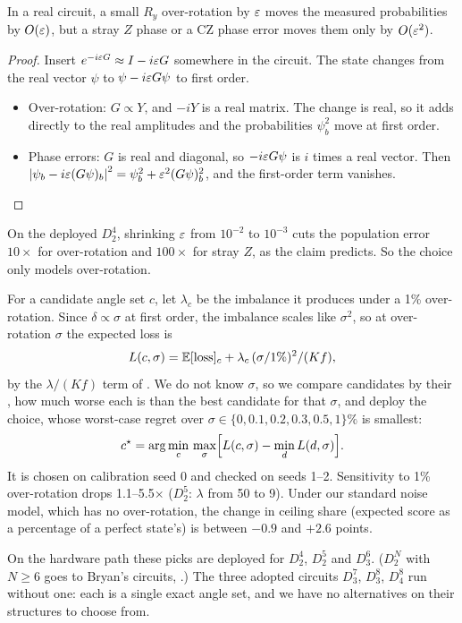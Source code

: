 \documentclass[11pt]{scrartcl}
\newcommand{\D}[2]{D^{#1}_{#2}}
\newcommand{\CZ}{\ensuremath{\mathrm{CZ}}}
\begin{document}
\begin{claim}
  In a real circuit, a small $R_y$ over-rotation by $\varepsilon$ moves the measured probabilities by
  $O(\varepsilon)$, but a stray $Z$ phase or a \CZ{} phase error moves them only by $O(\varepsilon^2)$.
\end{claim}
\begin{proof}
  Insert $e^{-i\varepsilon G}\approx I-i\varepsilon G$ somewhere in the circuit. The state changes from the real
  vector $\psi$ to $\psi-i\varepsilon G\psi$ to first order.
  \begin{itemize}
    \item Over-rotation: $G\propto Y$, and $-iY$ is a real matrix. The change is real, so it adds
          directly to the real amplitudes and the probabilities $\psi_b^2$ move at first order.
    \item Phase errors: $G$ is real and diagonal, so $-i\varepsilon G\psi$ is $i$ times a real vector. Then
          $\left\lvert \psi_b-i\varepsilon(G\psi)_b \right\rvert^2=\psi_b^2+\varepsilon^2(G\psi)_b^2$, and the first-order term
          vanishes.\qedhere
  \end{itemize}
\end{proof}

On the deployed $\D42$, shrinking $\varepsilon$ from $10^{-2}$ to $10^{-3}$ cuts the population error
$10\times$ for over-rotation and $100\times$ for stray $Z$, as the claim predicts. So the choice only
models over-rotation.

For a candidate angle set $c$, let $\lambda_c$ be the imbalance it produces under a 1\%
over-rotation. Since $\delta\propto\sigma$ at first order, the imbalance scales like $\sigma^2$, so
at over-rotation $\sigma$ the expected loss is
\[
  L(c,\sigma)=\mathbb E[\mathrm{loss}]_c+\lambda_c\,(\sigma/1\%)^2/(Kf),
\]
by the $\lambda/(Kf)$ term of . We do not know $\sigma$, so we compare candidates by
their , how much worse each is than the best candidate for that $\sigma$, and deploy
the  choice, whose worst-case regret over
$\sigma\in\{0,0.1,0.2,0.3,0.5,1\}\%$ is smallest:
\[
  c^\star=\arg\min_c\,\max_\sigma\Bigl[L(c,\sigma)-\min_d L(d,\sigma)\Bigr].
\]
It is chosen on calibration seed 0 and checked on seeds 1--2. Sensitivity to 1\% over-rotation drops
1.1--5.5$\times$ ($\D52$: $\lambda$ from 50 to 9). Under our standard noise model, which has no
over-rotation, the change in ceiling share (expected score as a percentage of a perfect state's) is
between $-0.9$ and $+2.6$ points.

On the hardware path these picks are deployed for $\D42$, $\D52$ and $\D63$. ($\D N2$ with $N\ge6$
goes to Bryan's circuits, .) The three adopted circuits $\D73$, $\D83$, $\D84$ run
without one: each is a single exact angle set, and we have no alternatives on their structures to
choose from.
\end{document}
